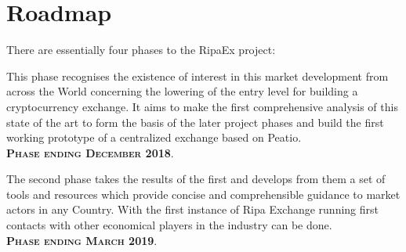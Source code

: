 \documentclass[11pt,fleqn,oneside]{book} %
\begin{document}
\pagebreak
\section{Roadmap}
There are essentially four phases to the RipaEx project:\\

\begin{center}
\begin{tcolorbox}[roadmapBox,
	title=\textsc{Funding the project: XPX presale and RIPA TEC (WP2)}]

	This phase recognises the existence of interest in this market development
	from across the World concerning the lowering of the entry level for building a cryptocurrency exchange.
	It aims to make the first comprehensive analysis of this state of the art to form the basis of the later project phases and
	build the first working prototype of a centralized exchange based on Peatio.\\
	\vspace{1cm}
	\centering\textbf{\textsc{Phase ending December 2018}}.
\end{tcolorbox}

\resizebox{0.05\textwidth}{26pt}{$\Downarrow$}

\begin{tcolorbox}[roadmapBox,
	title=\textsc{First exchange opening and development of tools and resources (WP3)}]

	The second phase takes the results of the first 
	and develops from them a set of tools and resources which provide concise and comprehensible guidance to market actors in any
	Country. With the first instance of Ripa Exchange running first contacts with other economical players in the industry can be
	done.\\
	\vspace{1cm}
	\centering\textbf{\textsc{Phase ending March 2019}}.
\end{tcolorbox}

\resizebox{0.05\textwidth}{26pt}{$\Downarrow$}

\begin{tcolorbox}[roadmapBox,
	title=\textsc{Dissemination (WP 7/8) and Project Coordination (WP1)}]


\end{tcolorbox}
\end{center}
\end{document}
